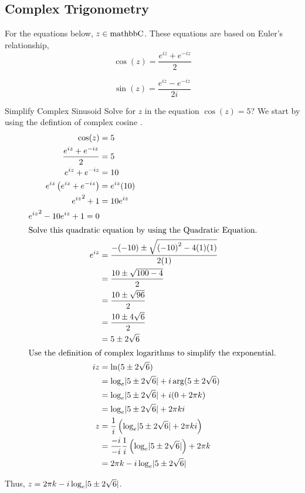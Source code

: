 \subsection{Complex Trigonometry}\label{subsec:Complex_Trigonometry}
For the equations below, $z \in \operatorname{mathbb{C}}$.
These equations are based on Euler's relationship, 
\begin{equation}\label{eq:Complex_Cosine}
  \cos(z) = \frac{e^{iz} + e^{-iz}}{2}
\end{equation}

\begin{equation}\label{eq:Complex_Sine}
  \sin(z) = \frac{e^{iz} - e^{-iz}}{2i}
\end{equation}

\begin{example}[Lecture 3]{Simplify Complex Sinusoid}
  Solve for $z$ in the equation $\cos(z) = 5$?
  \tcblower{}
  We start by using the defintion of complex cosine .
  \begin{align*}
    \cos(z) &= 5 \\
    \frac{e^{iz} + e^{-iz}}{2} &= 5 \\
    e^{iz} + e^{-iz} &= 10 \\
    e^{iz} \left( e^{iz} + e^{-iz} \right) &= e^{iz} (10) \\
    {e^{iz}}^{2} + 1 &= 10e^{iz} \\
    {e^{iz}}^{2} -10e^{iz} + 1 = 0 \\
    \shortintertext{Solve this quadratic equation by using the Quadratic Equation.}
    e^{iz} &= \frac{-(-10) \pm \sqrt{{(-10)}^{2} - 4(1)(1)}}{2(1)} \\
            &= \frac{10 \pm \sqrt{100 - 4}}{2} \\
            &= \frac{10 \pm \sqrt{96}}{2} \\
            &= \frac{10 \pm 4 \sqrt{6}}{2} \\
            &= 5 \pm 2 \sqrt{6} \\
    \intertext{Use the definition of complex logarithms to simplify the exponential.}
    iz &= \ln(5 \pm 2 \sqrt{6}) \\
            &= \log_{e} \lvert 5 \pm 2 \sqrt {6} \rvert + i \arg(5 \pm 2 \sqrt{6}) \\
            &= \log_{e} \lvert 5 \pm 2 \sqrt {6} \rvert + i (0 + 2\pi k) \\
            &= \log_{e} \lvert 5 \pm 2 \sqrt {6} \rvert + 2\pi k i \\
    z &= \frac{1}{i} \left( \log_{e} \lvert 5 \pm 2 \sqrt {6} \rvert + 2\pi k i \right) \\
            &= \frac{-i}{-i} \frac{1}{i} \left( \log_{e} \lvert 5 \pm 2 \sqrt {6} \rvert \right) + 2\pi k \\
    &= 2\pi k - i\log_{e} \lvert 5 \pm 2 \sqrt{6} \rvert
  \end{align*}

  Thus, $z = 2\pi k - i\log_{e} \lvert 5 \pm 2 \sqrt{6} \rvert$.
\end{example}


